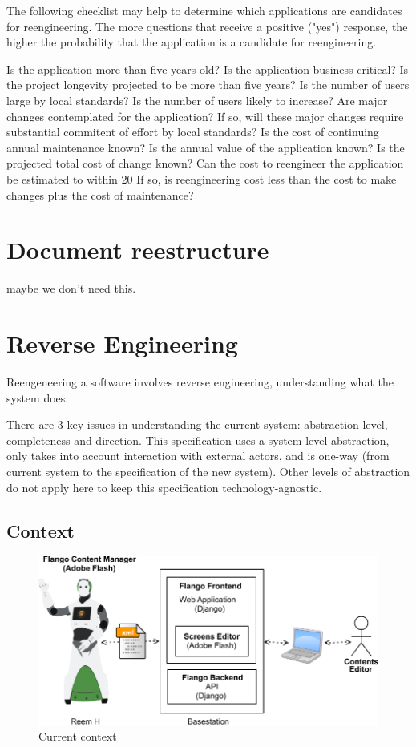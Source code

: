     
    The following checklist may help to determine which applications are candidates for reengineering. The more questions that receive a positive ("yes") response, the higher the probability that the application is a candidate for reengineering.

    Is the application more than five years old?
    Is the application business critical?
    Is the project longevity projected to be more than five years?
    Is the number of users large by local standards?
    Is the number of users likely to increase?
    Are major changes contemplated for the application?
    If so, will these major changes require substantial commitent of effort by local standards?
    Is the cost of continuing annual maintenance known?
    Is the annual value of the application known?
    Is the projected total cost of change known?
    Can the cost to reengineer the application be estimated to within 20%
    If so, is reengineering cost less than the cost to make changes plus the cost of maintenance?

\section{Document reestructure}
maybe we don't need this.

\section{Reverse Engineering}
\label{sec:context}
Reengeneering a software involves reverse engineering, understanding what the system does.

There are 3 key issues in understanding the current system: abstraction level, completeness and direction.
This specification uses a system-level abstraction, only takes into account interaction with external actors, and is one-way (from current system to the specification of the new system).
Other levels of abstraction do not apply here to keep this specification technology-agnostic.

\subsection{Context}
\begin{figure}[htb]
    \label{fig:context-original}
    \centering
    \includegraphics[width=\textwidth]{figures/context-original}
    \caption{Current context}
\end{figure}

